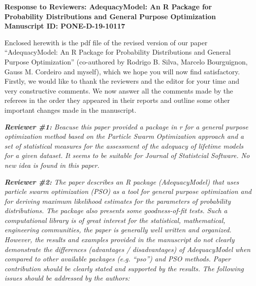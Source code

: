 \documentclass[a4paper,11pt]{exam}
\begin{document}
\noindent \textbf{\large Response to Reviewers: AdequacyModel: An R Package for Probability Distributions and General Purpose Optimization
\vskip3mm \noindent Manuscript ID: PONE-D-19-10117}
\vskip5mm

Enclosed herewith is the pdf file of the revised version of our paper “AdequacyModel: An R Package for Probability Distributions and General Purpose Optimization” (co-authored by Rodrigo B. Silva, Marcelo Bourguignon, Gauss M. Cordeiro and myself), which we hope you will now find satisfactory. Firstly, we would like to thank the reviewers and the editor for your time and very constructive comments. We now answer all the comments made by the referees in the order they appeared in their reports and outline some other important changes made in the manuscript.

\vskip3mm

\noindent \textit{\textbf{Reviewer \#1:} Beacuse this paper provided a package in r for a general purpose optimization method based on the Particle Swarm Optimization approach and a set of statistical measures for the assessment of the adequacy of lifetime models for a given dataset. It seems to be suitable for Journal of Statistcial Software. No new idea is found in this paper.}

\vskip3mm

\noindent \textit{\textbf{Reviewer \#2:} The paper describes an R package (AdequacyModel) that uses particle swarm optimization (PSO) as a tool for general purpose optimization and for deriving maximum likelihood estimates for the parameters of probability distributions. The package also presents some goodness-of-fit tests. Such a computational library is of great interest for the statistical, mathematical, engineering communities, the paper is generally well written and organized. However, the results and examples provided in the manuscript do not clearly demonstrate the differences (advantages / disadvantages) of AdequacyModel when compared to other available packages (e.g. “pso”) and PSO methods. Paper contribution should be clearly stated and supported by the results. The following issues should be addressed by the authors:}\\
\end{document}
